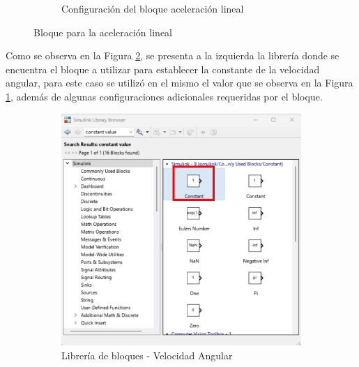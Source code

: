 \begin{figure}[htbp]
\begin{subfigure}[b]{0.45\textwidth}
        \caption{Configuración del bloque aceleración lineal}
        \label{fig:lib_bloques_config_linear_acceleration}
    \end{subfigure}
    \caption{Bloque para la aceleración lineal}
    \label{fig:linear_accel_block_simulink}
\end{figure}

Como se observa en la Figura \ref{fig:linear_accel_block_simulink}, se presenta a la izquierda la librería donde se encuentra el bloque a utilizar para establecer la constante de la velocidad angular, para este caso se utilizó en el mismo el valor que se observa en la Figura \ref{fig:lib_bloques_config_linear_acceleration}, además de algunas configuraciones adicionales requeridas por el bloque. 

\begin{figure}[htbp]
    \centering
    \begin{subfigure}[b]{0.45\textwidth}
        \centering
        \includegraphics[width=\textwidth]{fig/Capitulo5/Caso_de_estudio_IMU/Generador_de_archivos/libreria_de_bloques_constante_velocidad_angular.pdf}
        \caption{Librería de bloques - Velocidad Angular}
        \label{fig:lib_bloques_angular_velocity}
    \end{subfigure}
    \hfill
    \begin{subfigure}[b]{0.45\textwidth}
        \centering

\end{subfigure}
\end{figure}
